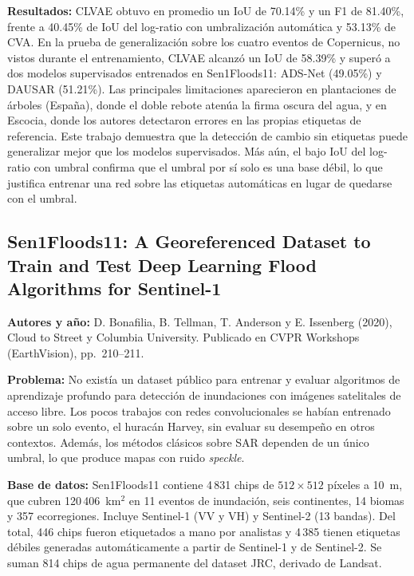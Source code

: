 \documentclass[conference]{IEEEtran}
\begin{document}
\textbf{Resultados:} CLVAE obtuvo en promedio un IoU de 70.14\% y un F1 de 81.40\%, frente a 40.45\% de IoU del log-ratio con umbralización automática y 53.13\% de CVA. En la prueba de generalización sobre los cuatro eventos de Copernicus, no vistos durante el entrenamiento, CLVAE alcanzó un IoU de 58.39\% y superó a dos modelos supervisados entrenados en Sen1Floods11: ADS-Net (49.05\%) y DAUSAR (51.21\%). Las principales limitaciones aparecieron en plantaciones de árboles (España), donde el doble rebote atenúa la firma oscura del agua, y en Escocia, donde los autores detectaron errores en las propias etiquetas de referencia. Este trabajo demuestra que la detección de cambio sin etiquetas puede generalizar mejor que los modelos supervisados. Más aún, el bajo IoU del log-ratio con umbral confirma que el umbral por sí solo es una base débil, lo que justifica entrenar una red sobre las etiquetas automáticas en lugar de quedarse con el umbral.

\subsection{Sen1Floods11: A Georeferenced Dataset to Train and Test Deep Learning Flood Algorithms for Sentinel-1 \cite{bonafilia2020sen1floods11}}

\textbf{Autores y año:} D. Bonafilia, B. Tellman, T. Anderson y E. Issenberg (2020), Cloud to Street y Columbia University. Publicado en CVPR Workshops (EarthVision), pp.~210--211.

\textbf{Problema:} No existía un dataset público para entrenar y evaluar algoritmos de aprendizaje profundo para detección de inundaciones con imágenes satelitales de acceso libre. Los pocos trabajos con redes convolucionales se habían entrenado sobre un solo evento, el huracán Harvey, sin evaluar su desempeño en otros contextos. Además, los métodos clásicos sobre SAR dependen de un único umbral, lo que produce mapas con ruido \textit{speckle}.

\textbf{Base de datos:} Sen1Floods11 contiene 4\,831 chips de $512\times512$ píxeles a 10~m, que cubren 120\,406~km$^2$ en 11 eventos de inundación, seis continentes, 14 biomas y 357 ecorregiones. Incluye Sentinel-1 (VV y VH) y Sentinel-2 (13 bandas). Del total, 446 chips fueron etiquetados a mano por analistas y 4\,385 tienen etiquetas débiles generadas automáticamente a partir de Sentinel-1 y de Sentinel-2. Se suman 814 chips de agua permanente del dataset JRC, derivado de Landsat.
\end{document}
